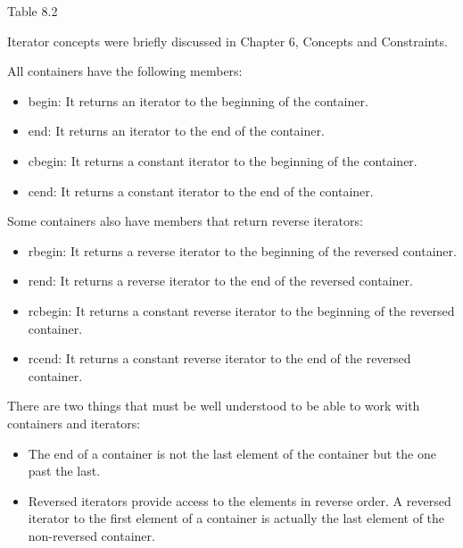 \begin{center}
Table 8.2
\end{center}

\begin{tcolorbox}[breakable,enhanced jigsaw,colback=blue!5!white,colframe=blue!75!black,title={Important Note}]
Iterator concepts were briefly discussed in Chapter 6, Concepts and Constraints.
\end{tcolorbox}

All containers have the following members:

\begin{itemize}
\item
begin: It returns an iterator to the beginning of the container.

\item
end: It returns an iterator to the end of the container.

\item
cbegin: It returns a constant iterator to the beginning of the container.

\item
cend: It returns a constant iterator to the end of the container.
\end{itemize}

Some containers also have members that return reverse iterators:

\begin{itemize}
\item
rbegin: It returns a reverse iterator to the beginning of the reversed container.

\item
rend: It returns a reverse iterator to the end of the reversed container.

\item
rcbegin: It returns a constant reverse iterator to the beginning of the reversed container.

\item
rcend: It returns a constant reverse iterator to the end of the reversed container.
\end{itemize}

There are two things that must be well understood to be able to work with containers and iterators:

\begin{itemize}
\item
The end of a container is not the last element of the container but the one past the last.

\item
Reversed iterators provide access to the elements in reverse order. A reversed iterator to the first element of a container is actually the last element of the non-reversed container.
\end{itemize}

